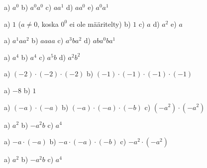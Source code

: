     \begin{tehtava}
        a) $a^0$ \qquad
        b) $a^0a^0$ \qquad
        c) $a a^1$ \qquad
        d) $aa^0$ \qquad
        e) $a^0a^1$
        
        \begin{vastaus}
            a) $1$ \quad ($a\neq0$, koska $0^0$ ei ole määritelty) \qquad
            b) $1$ \qquad
            c) $a$ \qquad
            d) $a^2$ \qquad
            e) $a$
        \end{vastaus}
    \end{tehtava}
    
    \begin{tehtava}
        a) $a^1 a a^2$ \qquad
        b) $aaaa$ \qquad
        c) $a^3ba^2$ \qquad
        d) $aba^0ba^1$
        
        \begin{vastaus}
            a) $ a^4$ \qquad
            b) $a^4$ \qquad
            c) $a^5b$ \qquad
            d) $a^2b^2$
        \end{vastaus}
    \end{tehtava}
    
    \begin{tehtava}
        a) $(-2)\cdot(-2)\cdot(-2)$ \qquad
        b) $(-1)\cdot(-1)\cdot(-1)\cdot(-1)$
        
        \begin{vastaus}
            a) $ -8$ \qquad
            b) $1$
        \end{vastaus}
    \end{tehtava}
    
    \begin{tehtava}
        a) $(-a)\cdot(-a)$ \qquad
        b) $(-a)\cdot(-a)\cdot(-b)$ \qquad
        c) $(-a^2)\cdot(-a^2)$

        \begin{vastaus}
            a) $a^2$ \qquad
            b) $-a^2b$ \qquad
            c) $a^4$
        \end{vastaus}
    \end{tehtava}

    \begin{tehtava}
        a) $-a\cdot(-a)$ \qquad
        b) $-a\cdot(-a)\cdot(-b)$ \qquad
        c) $-a^2\cdot(-a^2)$
    
        \begin{vastaus}
            a) $a^2$ \qquad
            b) $-a^2b$ \qquad
            c) $a^4$
        \end{vastaus}
    \end{tehtava}

